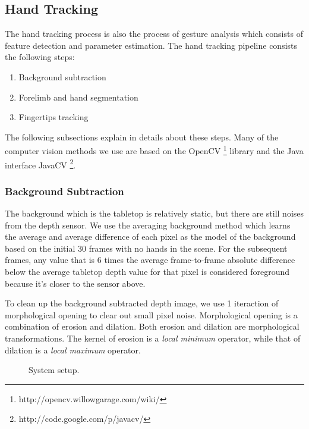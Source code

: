 \subsection{Hand Tracking}
The hand tracking process is also the process of gesture analysis which
consists of feature detection and parameter estimation. The hand tracking
pipeline consists the following steps:

\begin{enumerate}
  \item Background subtraction
  \item Forelimb and hand segmentation
  \item Fingertips tracking
\end{enumerate}

The following subsections explain in details about these steps. Many of the
computer vision methods we use are based on the OpenCV
\footnote{http://opencv.willowgarage.com/wiki/} library and the Java interface 
JavaCV \footnote{http://code.google.com/p/javacv/}.

\subsubsection{Background Subtraction}
The background which is the tabletop is relatively static, but there are still 
noises from the depth sensor. We use the averaging background method which
learns the average and average difference of each pixel as the model of the 
background based on the initial 30 frames with no hands in the scene. For the
subsequent frames, any value that is 6 times the average frame-to-frame absolute
difference below the average tabletop depth value for that pixel is considered 
foreground because it's closer to the sensor above.

To clean up the background subtracted depth image, we use 1 iteraction of
morphological opening to clear out small pixel noise. Morphological opening is a
combination of erosion and dilation. Both erosion and dilation are morphological
transformations. The kernel of erosion is a \textit{local minimum} operator,
while that of dilation is a \textit{local maximum} operator.

\begin{figure}
  \centering
  \caption{System setup.} \label{fig:setup}
\end{figure}


